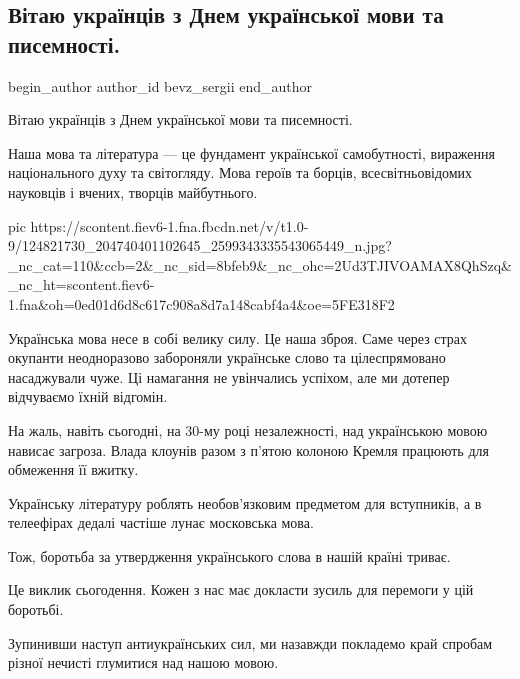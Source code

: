  
 
 
 
 
 
\subsection{Вітаю українців з Днем української мови та писемності.}
\label{sec:09_11_2020.fb.bevz_sergii.1.den_ukr_movy}
\ifcmt
	begin_author
   author_id bevz_sergii
	end_author
\fi

Вітаю українців з Днем української мови та писемності.

Наша мова та література --- це фундамент української самобутності, вираження
національного духу та світогляду. Мова героїв та борців, всесвітньовідомих
науковців і вчених, творців майбутнього.

\ifcmt
pic https://scontent.fiev6-1.fna.fbcdn.net/v/t1.0-9/124821730_204740401102645_2599343335543065449_n.jpg?_nc_cat=110&ccb=2&_nc_sid=8bfeb9&_nc_ohc=2Ud3TJIVOAMAX8QhSzq&_nc_ht=scontent.fiev6-1.fna&oh=0ed01d6d8c617c908a8d7a148cabf4a4&oe=5FE318F2
\fi

Українська мова несе в собі велику силу. Це наша зброя. Саме через страх
окупанти неодноразово забороняли українське слово та цілеспрямовано насаджували
чуже. Ці намагання не увінчались успіхом, але ми дотепер відчуваємо їхній
відгомін.

На жаль, навіть сьогодні, на 30-му році незалежності, над українською мовою
нависає загроза. Влада клоунів разом з  п'ятою колоною Кремля працюють для
обмеження її вжитку. 

Українську літературу роблять необов'язковим предметом для вступників, а в
телеефірах дедалі частіше лунає московська мова.

Тож, боротьба за утвердження українського слова в нашій країні триває. 

Це виклик сьогодення. Кожен з нас має докласти зусиль для перемоги у цій
боротьбі. 

Зупинивши наступ антиукраїнських сил, ми назавжди покладемо край спробам різної
нечисті глумитися над нашою мовою.

